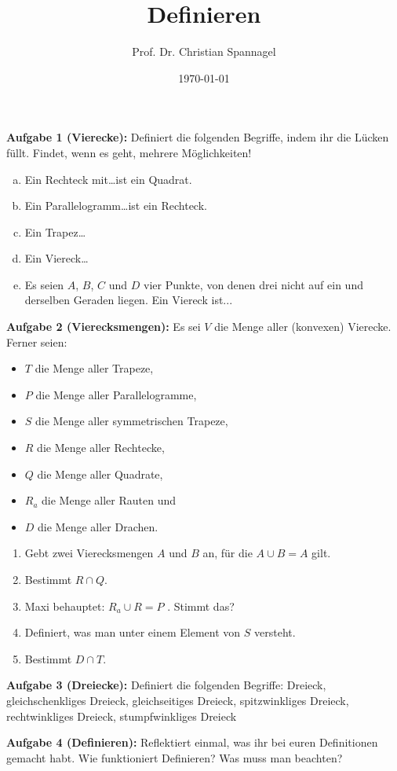 \documentclass{../cssheet}
\title{Definieren}
\author{Prof. Dr. Christian Spannagel}
\date{\today}
\begin{document}
\printtitle

\textbf{Aufgabe 1 (Vierecke):}  Definiert die folgenden Begriffe, indem ihr die Lücken füllt. Findet, wenn es geht, mehrere Möglichkeiten!
\begin{enumerate}[a)]
\item Ein Rechteck mit\ldots ist ein Quadrat.
\item Ein Parallelogramm\ldots ist ein Rechteck.
\item Ein Trapez\ldots
\item Ein Viereck\ldots
\item Es seien $A$, $B$, $C$ und $D$ vier Punkte, von denen drei nicht auf ein und derselben Geraden liegen. Ein Viereck ist...
\end{enumerate}

\textbf{Aufgabe 2 (Vierecksmengen):} Es sei $V$ die Menge aller (konvexen) Vierecke. Ferner seien: 
\begin{itemize}
\item $T$ die Menge aller Trapeze,
\item $P$ die Menge aller Parallelogramme,
\item $S$ die Menge aller symmetrischen Trapeze,
\item $R$ die Menge aller Rechtecke,
\item $Q$ die Menge aller Quadrate,
\item $R_a$ die Menge aller Rauten und
\item $D$ die Menge aller Drachen.
\end{itemize}
\begin{enumerate}
\item Gebt zwei Vierecksmengen $A$ und $B$ an, für die $A\cup B = A$ gilt.
\item Bestimmt $R \cap Q$.
\item Maxi behauptet: $R_a \cup R = P$ . Stimmt das?
\item Definiert, was man unter einem Element von $S$ versteht.
\item Bestimmt $D\cap T$.
\end{enumerate}

\textbf{Aufgabe 3 (Dreiecke):}  Definiert die folgenden Begriffe: Dreieck, gleichschenkliges Dreieck, gleichseitiges Dreieck, spitzwinkliges Dreieck, rechtwinkliges Dreieck, stumpfwinkliges Dreieck

\textbf{Aufgabe 4 (Definieren):}  Reflektiert einmal, was ihr bei euren Definitionen gemacht habt. Wie funktioniert Definieren? Was muss man beachten?


\newpage
\printlicense

\printsocials

\end{document}
